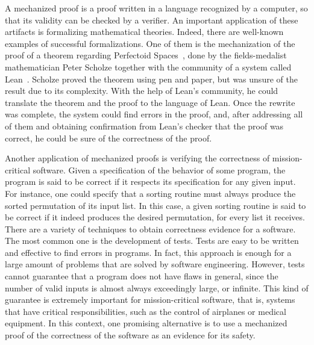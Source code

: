 A mechanized proof is a proof written in a language recognized by a computer, so that its validity can be checked by a verifier. An important application of these artifacts is formalizing mathematical theories. Indeed, there are well-known examples of successful formalizations. One of them is the mechanization of the proof of a theorem regarding Perfectoid Spaces~\cite{scholze}, done by the fields-medalist mathematician Peter Scholze together with the community of a system called Lean~\cite{lean}. Scholze proved the theorem using pen and paper, but was unsure of the result due to its complexity. With the help of Lean's community, he could translate the theorem and the proof to the language of Lean. Once the rewrite was complete, the system could find errors in the proof, and, after addressing all of them and obtaining confirmation from Lean's checker that the proof was correct, he could be sure of the correctness of the proof.

Another application of mechanized proofs is verifying the correctness of mission-critical software. Given a specification of the behavior of some program, the program is said to be correct if it respects its specification for any given input. For instance, one could specify that a sorting routine must always produce the sorted permutation of its input list. In this case, a given sorting routine is said to be correct if it indeed produces the desired permutation, for every list it receives. There are a variety of techniques to obtain correctness evidence for a software. The most common one is the development of tests. Tests are easy to be written and effective to find errors in programs. In fact, this approach is enough for a large amount of problems that are solved by software engineering. However, tests cannot guarantee that a program does not have flaws in general, since the number of valid inputs is almost always exceedingly large, or infinite. This kind of guarantee is extremely important for mission-critical software, that is, systems that have critical responsibilities, such as the control of airplanes or medical equipment. In this context, one promising alternative is to use a mechanized proof of the correctness of the software as an evidence for its safety.

